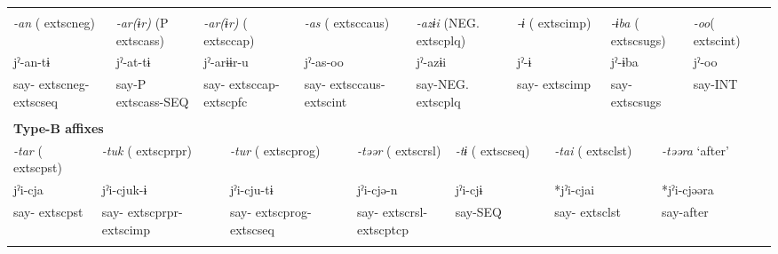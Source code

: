 \tabletail{}
\tablelasttail{}
\begin{tabularx}{\textwidth}{XXm{}XXXXXXXXXXXXXXXXXXXX}
\lsptoprule
\multicolumn{23}{X}{{\bfseries Type-A affixes}}\\
\multicolumn{3}{X}{{ \textit{{}-an} (	extsc{neg})}} & \multicolumn{3}{X}{{ \textit{{}-ar(ɨr)} (P	extsc{ass})}} & \multicolumn{4}{X}{{ \textit{{}-ar(ɨr)} (	extsc{cap})}} & \multicolumn{4}{X}{{ \textit{{}-as} (	extsc{caus})}} & \multicolumn{3}{X}{{ \textit{{}-azɨi} (NEG.	extsc{plq})}} & \multicolumn{2}{X}{{ \textit{{}-ɨ} (	extsc{imp})}} & \multicolumn{2}{X}{{ \textit{{}-ɨba} (	extsc{sugs})}} & { \textit{{}-oo}(	extsc{int})} & \\
\multicolumn{3}{X}{{ jˀ-an-tɨ}} & \multicolumn{3}{X}{{ jˀ-at-tɨ}} & \multicolumn{4}{X}{{ jˀ-arɨɨr-u}} & \multicolumn{4}{X}{{ jˀ-as-oo}} & \multicolumn{3}{X}{{ jˀ-azɨi}} & \multicolumn{2}{X}{{ jˀ-ɨ}} & \multicolumn{2}{X}{{ jˀ-ɨba}} & { jˀ-oo} & \\
\multicolumn{3}{X}{say-	extsc{neg}-	extsc{seq}} & \multicolumn{3}{X}{say-P	extsc{ass}-SEQ} & \multicolumn{4}{X}{say-	extsc{cap}-	extsc{pfc}} & \multicolumn{4}{X}{say-	extsc{caus}-	extsc{int}} & \multicolumn{3}{X}{say-NEG.	extsc{plq}} & \multicolumn{2}{X}{say-	extsc{imp}} & \multicolumn{2}{X}{say-	extsc{sugs}} & say-INT & \\
\multicolumn{23}{X}{}\\
\multicolumn{23}{X}{{\bfseries Type-B affixes}}\\
\multicolumn{2}{X}{{ \textit{{}-tar} (	extsc{pst})}} & \multicolumn{6}{X}{{ \textit{{}-tuk} (	extsc{prpr})}} & \multicolumn{3}{X}{{ \textit{{}-tur} (	extsc{prog})}} & \multicolumn{4}{X}{{ \textit{{}-təər} (	extsc{rsl})}} & \multicolumn{3}{X}{{ \textit{{}-tɨ} (	extsc{seq})}} & \multicolumn{2}{X}{{ \textit{{}-tai} (	extsc{lst})}} & \multicolumn{3}{X}{{ \textit{{}-təəra} ‘after’}}\\
\multicolumn{2}{X}{{ jˀi-cja}} & \multicolumn{6}{X}{{ jˀi-cjuk-ɨ}} & \multicolumn{3}{X}{{ jˀi-cju-tɨ}} & \multicolumn{4}{X}{{ jˀi-cjə-n}} & \multicolumn{3}{X}{{ jˀi-cjɨ}} & \multicolumn{2}{X}{{ *jˀi-cjai}} & \multicolumn{3}{X}{{ *jˀi-cjəəra}}\\
\multicolumn{2}{X}{say-	extsc{pst}} & \multicolumn{6}{X}{say-	extsc{prpr}-	extsc{imp}} & \multicolumn{3}{X}{say-	extsc{prog}-	extsc{seq}} & \multicolumn{4}{X}{say-	extsc{rsl}-	extsc{ptcp}} & \multicolumn{3}{X}{say-SEQ} & \multicolumn{2}{X}{say-	extsc{lst}} & \multicolumn{3}{X}{{ say-after}}\\
\multicolumn{2}{X}{} & \multicolumn{6}{X}{} & \multicolumn{3}{X}{} & \multicolumn{4}{X}{} & \multicolumn{3}{X}{} & \multicolumn{2}{X}{} & \multicolumn{3}{X}{}\\

\end{tabularx}
